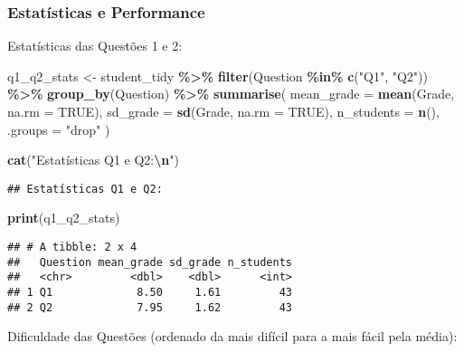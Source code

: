 \documentclass[
]{article}
\newenvironment{Shaded}{\begin{snugshade}}{\end{snugshade}}
\newcommand{\AttributeTok}[1]{\textcolor[rgb]{0.13,0.29,0.53}{#1}}
\newcommand{\ConstantTok}[1]{\textcolor[rgb]{0.56,0.35,0.01}{#1}}
\newcommand{\FunctionTok}[1]{\textcolor[rgb]{0.13,0.29,0.53}{\textbf{#1}}}
\newcommand{\NormalTok}[1]{#1}
\newcommand{\OtherTok}[1]{\textcolor[rgb]{0.56,0.35,0.01}{#1}}
\newcommand{\SpecialCharTok}[1]{\textcolor[rgb]{0.81,0.36,0.00}{\textbf{#1}}}
\newcommand{\StringTok}[1]{\textcolor[rgb]{0.31,0.60,0.02}{#1}}
\begin{document}
\subsubsection{Estatísticas e
Performance}\label{estatuxedsticas-e-performance}

Estatísticas das Questões 1 e 2:

\begin{Shaded}
\begin{Highlighting}[]
\NormalTok{q1\_q2\_stats }\OtherTok{\textless{}{-}}\NormalTok{ student\_tidy }\SpecialCharTok{\%\textgreater{}\%}
  \FunctionTok{filter}\NormalTok{(Question }\SpecialCharTok{\%in\%} \FunctionTok{c}\NormalTok{(}\StringTok{"Q1"}\NormalTok{, }\StringTok{"Q2"}\NormalTok{)) }\SpecialCharTok{\%\textgreater{}\%}
  \FunctionTok{group\_by}\NormalTok{(Question) }\SpecialCharTok{\%\textgreater{}\%}
  \FunctionTok{summarise}\NormalTok{(}
    \AttributeTok{mean\_grade =} \FunctionTok{mean}\NormalTok{(Grade, }\AttributeTok{na.rm =} \ConstantTok{TRUE}\NormalTok{),}
    \AttributeTok{sd\_grade =} \FunctionTok{sd}\NormalTok{(Grade, }\AttributeTok{na.rm =} \ConstantTok{TRUE}\NormalTok{),}
    \AttributeTok{n\_students =} \FunctionTok{n}\NormalTok{(),}
    \AttributeTok{.groups =} \StringTok{"drop"}
\NormalTok{  )}

\FunctionTok{cat}\NormalTok{(}\StringTok{"Estatísticas Q1 e Q2:}\SpecialCharTok{\textbackslash{}n}\StringTok{"}\NormalTok{)}
\end{Highlighting}
\end{Shaded}

\begin{verbatim}
## Estatísticas Q1 e Q2:
\end{verbatim}

\begin{Shaded}
\begin{Highlighting}[]
\FunctionTok{print}\NormalTok{(q1\_q2\_stats)}
\end{Highlighting}
\end{Shaded}

\begin{verbatim}
## # A tibble: 2 x 4
##   Question mean_grade sd_grade n_students
##   <chr>         <dbl>    <dbl>      <int>
## 1 Q1             8.50     1.61         43
## 2 Q2             7.95     1.62         43
\end{verbatim}

Dificuldade das Questões (ordenado da mais difícil para a mais fácil
pela média):
\end{document}
